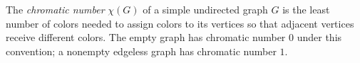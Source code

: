 
The \emph{chromatic number} $\chi(G)$ of a simple undirected graph $G$ is the least number of colors needed to assign colors to its vertices so that adjacent vertices receive different colors. The empty graph has chromatic number $0$ under this convention; a nonempty edgeless graph has chromatic number $1$.
